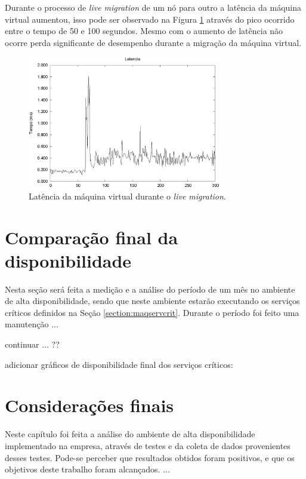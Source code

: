 Durante o processo de \textit{live migration} de um nó para outro a latência da máquina virtual aumentou, isso pode ser observado na Figura 
\ref{fig:teste2_latencia} através do pico ocorrido entre o tempo de 50 e 100 segundos. Mesmo com o aumento de latência não ocorre 
perda significante de desempenho durante a migração da máquina virtual.
\begin{figure}[h!]
 \centering
 \includegraphics[width=320px]{img/teste2_latencia.eps}
 \caption{Latência da máquina virtual durante o \textit{live migration}.}
 \label{fig:teste2_latencia}
\end{figure}



\section{Comparação final da disponibilidade}
\label{section:comparacaofinal}

Nesta seção será feita a medição e a análise do período de um mês no ambiente de alta disponibilidade, sendo que neste ambiente estarão executando 
os serviços críticos definidos na Seção \ref{section:maqservcrit}.
Durante o período foi feito uma manutenção ...

continuar ... ??

adicionar gráficos de disponibilidade final dos serviços críticos:



\section{Considerações finais}

Neste capítulo foi feita a análise do ambiente de alta disponibilidade implementado na empresa, através de testes e da coleta de dados
provenientes desses testes. Pode-se perceber que resultados obtidos foram positivos, e que os objetivos deste trabalho foram alcançados. 
...
